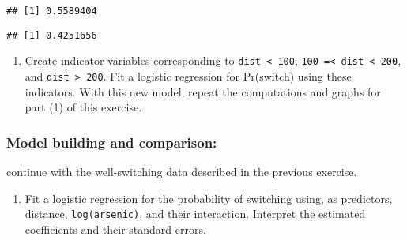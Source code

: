 \documentclass[]{article}
\newenvironment{Shaded}{\begin{snugshade}}{\end{snugshade}}
\newcommand{\KeywordTok}[1]{\textcolor[rgb]{0.13,0.29,0.53}{\textbf{#1}}}
\newcommand{\DataTypeTok}[1]{\textcolor[rgb]{0.13,0.29,0.53}{#1}}
\newcommand{\DecValTok}[1]{\textcolor[rgb]{0.00,0.00,0.81}{#1}}
\newcommand{\FloatTok}[1]{\textcolor[rgb]{0.00,0.00,0.81}{#1}}
\newcommand{\StringTok}[1]{\textcolor[rgb]{0.31,0.60,0.02}{#1}}
\newcommand{\CommentTok}[1]{\textcolor[rgb]{0.56,0.35,0.01}{\textit{#1}}}
\newcommand{\ControlFlowTok}[1]{\textcolor[rgb]{0.13,0.29,0.53}{\textbf{#1}}}
\newcommand{\OperatorTok}[1]{\textcolor[rgb]{0.81,0.36,0.00}{\textbf{#1}}}
\newcommand{\NormalTok}[1]{#1}
\providecommand{\tightlist}{%
  \setlength{\itemsep}{0pt}\setlength{\parskip}{0pt}}
\begin{document}
\begin{verbatim}
## [1] 0.5589404
\end{verbatim}

\begin{Shaded}
\end{Shaded}

\begin{verbatim}
## [1] 0.4251656
\end{verbatim}

\begin{enumerate}
\def\labelenumi{\arabic{enumi}.}
\setcounter{enumi}{4}
\tightlist
\item
  Create indicator variables corresponding to
  \texttt{dist\ \textless{}\ 100},
  \texttt{100\ =\textless{}\ dist\ \textless{}\ 200}, and
  \texttt{dist\ \textgreater{}\ 200}. Fit a logistic regression for
  Pr(switch) using these indicators. With this new model, repeat the
  computations and graphs for part (1) of this exercise.
\end{enumerate}

\subsubsection{Model building and
comparison:}\label{model-building-and-comparison}

continue with the well-switching data described in the previous
exercise.

\begin{enumerate}
\def\labelenumi{\arabic{enumi}.}
\tightlist
\item
  Fit a logistic regression for the probability of switching using, as
  predictors, distance, \texttt{log(arsenic)}, and their interaction.
  Interpret the estimated coefficients and their standard errors.
\end{enumerate}
\end{document}
